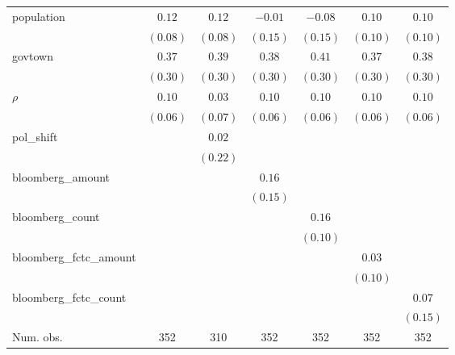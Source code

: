 \begin{table}[!h]
\begin{center}
\begin{tabular}{l c c c c c c }
population              & $0.12$       & $0.12$       & $-0.01$      & $-0.08$      & $0.10$       & $0.10$       \\
                        & $(0.08)$     & $(0.08)$     & $(0.15)$     & $(0.15)$     & $(0.10)$     & $(0.10)$     \\
govtown                 & $0.37$       & $0.39$       & $0.38$       & $0.41$       & $0.37$       & $0.38$       \\
                        & $(0.30)$     & $(0.30)$     & $(0.30)$     & $(0.30)$     & $(0.30)$     & $(0.30)$     \\
$\rho$                  & $0.10$       & $0.03$       & $0.10$       & $0.10$       & $0.10$       & $0.10$       \\
                        & $(0.06)$     & $(0.07)$     & $(0.06)$     & $(0.06)$     & $(0.06)$     & $(0.06)$     \\
pol\_shift              &              & $0.02$       &              &              &              &              \\
                        &              & $(0.22)$     &              &              &              &              \\
bloomberg\_amount       &              &              & $0.16$       &              &              &              \\
                        &              &              & $(0.15)$     &              &              &              \\
bloomberg\_count        &              &              &              & $0.16$       &              &              \\
                        &              &              &              & $(0.10)$     &              &              \\
bloomberg\_fctc\_amount &              &              &              &              & $0.03$       &              \\
                        &              &              &              &              & $(0.10)$     &              \\
bloomberg\_fctc\_count  &              &              &              &              &              & $0.07$       \\
                        &              &              &              &              &              & $(0.15)$     \\
\midrule
Num. obs.               & 352          & 310          & 352          & 352          & 352          & 352          \\

\end{tabular}
\end{center}
\end{table}
